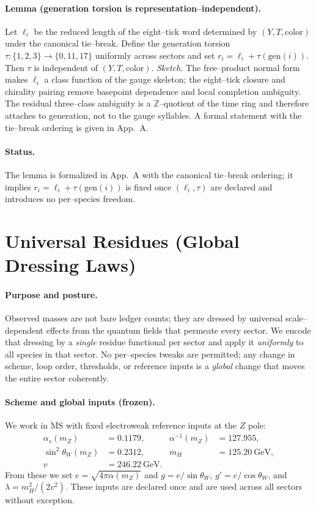 \documentclass[epjc3]{svjour3}
\begin{document}

\paragraph{Lemma (generation torsion is representation–independent).}
Let $\ell_i$ be the reduced length of the eight–tick word determined by $(Y,T,\text{color})$ under the canonical tie–break.
Define the generation torsion $\tau:\{1,2,3\}\to\{0,11,17\}$ uniformly across sectors and set $r_i=\ell_i+\tau(\mathrm{gen}(i))$.
Then $\tau$ is independent of $(Y,T,\text{color})$.
\emph{Sketch.} The free–product normal form makes $\ell_i$ a class function of the gauge skeleton; the eight–tick closure and chirality pairing remove basepoint dependence and local completion ambiguity. The residual three–class ambiguity is a $\mathbb{Z}$–quotient of the time ring and therefore attaches to generation, not to the gauge syllables. A formal statement with the tie–break ordering is given in App.~A.
\paragraph{Status.}
The lemma is formalized in App.~A with the canonical tie--break ordering; it implies $r_i=\ell_i+\tau(\mathrm{gen}(i))$ is fixed once $(\ell_i,\tau)$ are declared and introduces no per--species freedom.

\section{Universal Residues (Global Dressing Laws)}

\paragraph{Purpose and posture.}
Observed masses are not bare ledger counts; they are dressed by universal scale–dependent effects from the quantum fields that permeate every sector. We encode that dressing by a \emph{single} residue functional per sector and apply it \emph{uniformly} to all species in that sector. No per–species tweaks are permitted; any change in scheme, loop order, thresholds, or reference inputs is a \emph{global} change that moves the entire sector coherently.

\paragraph{Scheme and global inputs (frozen).}
We work in $\overline{\mathrm{MS}}$ with fixed electroweak reference inputs at the $Z$ pole:
\begin{align*}
\alpha_s(m_Z)&=0.1179, & \alpha^{-1}(m_Z)&=127.955,\\
\sin^2\!\theta_W(m_Z)&=0.2312, & m_H&=125.20~\mathrm{GeV},\\
v&=246.22~\mathrm{GeV}. & &
\end{align*}
From these we set $e=\sqrt{4\pi\alpha(m_Z)}$ and
$g=e/\sin\theta_W$, $g'=e/\cos\theta_W$, and $\lambda=m_H^2/(2v^2)$.
These inputs are declared once and are used across all sectors without exception.
\end{document}

